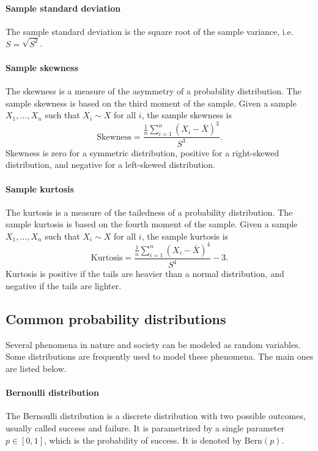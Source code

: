 \paragraph{Sample standard deviation}  The sample standard deviation is the square root
of the sample variance, i.e. $S = \sqrt{S^2}$.

\paragraph{Sample skewness}  The skewness is a measure of the asymmetry of a probability
distribution.  The sample skewness is based on the third moment of the sample.  Given a
sample $X_1, \dots, X_n$ such that $X_i \sim X$ for all $i$, the sample skewness is
\begin{equation*}
  \text{Skewness} = \frac{\frac{1}{n} \sum_{i = 1}^n (X_i - \bar{X})^3}{S^3}\text{.}
\end{equation*}
Skewness is zero for a symmetric distribution, positive for a right-skewed distribution,
and negative for a left-skewed distribution.

\paragraph{Sample kurtosis}  The kurtosis is a measure of the tailedness of a probability
distribution.  The sample kurtosis is based on the fourth moment of the sample.  Given a
sample $X_1, \dots, X_n$ such that $X_i \sim X$ for all $i$, the sample kurtosis is
\begin{equation*}
  \text{Kurtosis} = \frac{\frac{1}{n} \sum_{i = 1}^n (X_i - \bar{X})^4}{S^4} - 3\text{.}
\end{equation*}
Kurtosis is positive if the tails are heavier than a normal distribution, and negative if
the tails are lighter.

\subsection{Common probability distributions}

Several phenomena in nature and society can be modeled as random variables.  Some
distributions are frequently used to model these phenomena.  The main ones are
listed below.

\paragraph{Bernoulli distribution}  The Bernoulli distribution is a discrete
distribution with two possible outcomes, usually called success and failure.  It is
parametrized by a single parameter $p \in [0, 1]$, which is the probability of
success.  It is denoted by $\text{Bern}(p)$.


